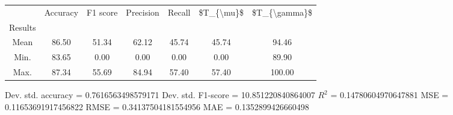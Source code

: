 \begin{tabular}{|c|c|c|c|c|c|c|}
\toprule
{} &  Accuracy &  F1 score &  Precision &  Recall &  \$T\_\{\textbackslash mu\}\$ &  \$T\_\{\textbackslash gamma\}\$ \\
Results &           &           &            &         &            &               \\
\hline
Mean    &     86.50 &     51.34 &      62.12 &   45.74 &      45.74 &         94.46 \\
Min.    &     83.65 &      0.00 &       0.00 &    0.00 &       0.00 &         89.90 \\
Max.    &     87.34 &     55.69 &      84.94 &   57.40 &      57.40 &        100.00 \\
\bottomrule
\end{tabular}

 Dev. std. accuracy = 0.7616563498579171
 Dev. std. F1-score = 10.851220840864007
 $R^2$ = 0.14780604970647881
 MSE = 0.11653691917456822
 RMSE = 0.34137504181554956
 MAE = 0.1352899426660498